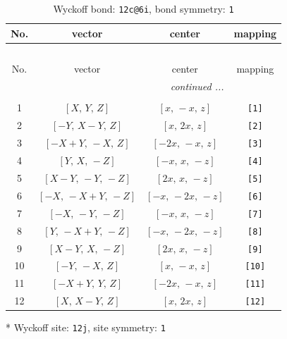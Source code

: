 \documentclass[fleqn,8pt]{jsarticle}
\begin{document}
\begin{longtable}{cccc}
\caption{Wyckoff bond: {\tt 12c@6i}, bond symmetry: {\tt 1}}
 \\
 \hline \hline
No. & vector & center & mapping \\ \hline \endfirsthead

\multicolumn{3}{l}{\tablename\ \thetable{}} \\
 \hline \hline
No. & vector & center & mapping \\ \hline \endhead

 \hline \hline
\multicolumn{3}{r}{\footnotesize\it continued ...} \\ \endfoot

 \hline \hline
\multicolumn{3}{r}{} \\ \endlastfoot

1 & $\left[ X,\, Y,\, Z \right]$ & $\left[ x,\, - x,\, z \right]$ & {\tt [1]} \\ \hline
2 & $\left[ - Y,\, X - Y,\, Z \right]$ & $\left[ x,\, 2 x,\, z \right]$ & {\tt [2]} \\ \hline
3 & $\left[ - X + Y,\, - X,\, Z \right]$ & $\left[ - 2 x,\, - x,\, z \right]$ & {\tt [3]} \\ \hline
4 & $\left[ Y,\, X,\, - Z \right]$ & $\left[ - x,\, x,\, - z \right]$ & {\tt [4]} \\ \hline
5 & $\left[ X - Y,\, - Y,\, - Z \right]$ & $\left[ 2 x,\, x,\, - z \right]$ & {\tt [5]} \\ \hline
6 & $\left[ - X,\, - X + Y,\, - Z \right]$ & $\left[ - x,\, - 2 x,\, - z \right]$ & {\tt [6]} \\ \hline
7 & $\left[ - X,\, - Y,\, - Z \right]$ & $\left[ - x,\, x,\, - z \right]$ & {\tt [7]} \\ \hline
8 & $\left[ Y,\, - X + Y,\, - Z \right]$ & $\left[ - x,\, - 2 x,\, - z \right]$ & {\tt [8]} \\ \hline
9 & $\left[ X - Y,\, X,\, - Z \right]$ & $\left[ 2 x,\, x,\, - z \right]$ & {\tt [9]} \\ \hline
10 & $\left[ - Y,\, - X,\, Z \right]$ & $\left[ x,\, - x,\, z \right]$ & {\tt [10]} \\ \hline
11 & $\left[ - X + Y,\, Y,\, Z \right]$ & $\left[ - 2 x,\, - x,\, z \right]$ & {\tt [11]} \\ \hline
12 & $\left[ X,\, X - Y,\, Z \right]$ & $\left[ x,\, 2 x,\, z \right]$ & {\tt [12]} \\
\end{longtable}
* Wyckoff site: {\tt 12j}, site symmetry: {\tt 1}
\renewcommand{\arraystretch}{1.2}
\end{document}
